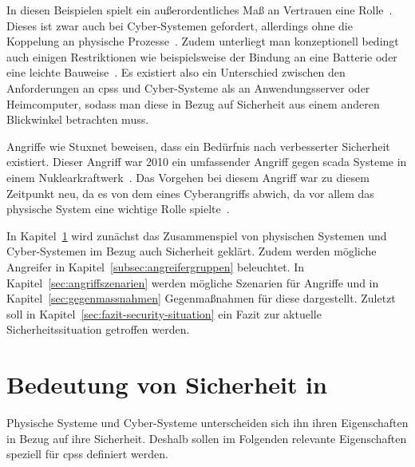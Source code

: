 \documentclass[final,bibliography=totocnumbered]{include/sikseminar}
\newcommand{\cps}{\glspl{cps}\xspace}
\begin{document}
    In diesen Beispielen spielt ein außerordentliches Maß an Vertrauen eine Rolle~\cite{SGL+08}.
    Dieses ist zwar auch bei Cyber-Systemen gefordert, allerdings ohne die Koppelung an physische Prozesse~\cite{BG11}.
    Zudem unterliegt man konzeptionell bedingt auch einigen Restriktionen wie beispielsweise der Bindung an eine Batterie oder eine leichte Bauweise~\cite{YWY+17}.
    Es existiert also ein Unterschied zwischen den Anforderungen an \cps und Cyber-Systeme als an Anwendungsserver oder Heimcomputer, sodass man diese in Bezug auf Sicherheit aus einem anderen Blickwinkel betrachten muss.

    Angriffe wie Stuxnet beweisen, dass ein Bedürfnis nach verbesserter Sicherheit existiert.
    Dieser Angriff war 2010 ein umfassender Angriff gegen \gls{scada} Systeme in einem Nuklearkraftwerk~\cite{Langner11}.
    Das Vorgehen bei diesem Angriff war zu diesem Zeitpunkt neu, da es von dem eines Cyberangriffs abwich, da vor allem das physische System eine wichtige Rolle spielte~\cite{Langner11}.

    In Kapitel~\ref{sec:bedeutung-sicherheit} wird zunächst das Zusammenspiel von physischen Systemen und Cyber-Systemen im Bezug auch Sicherheit geklärt.
    Zudem werden mögliche Angreifer in Kapitel~\ref{subsec:angreifergruppen} beleuchtet.
    In Kapitel~\ref{sec:angriffszenarien} werden mögliche Szenarien für Angriffe und in Kapitel~\ref{sec:gegenmassnahmen} Gegenmaßnahmen für diese dargestellt.
    Zuletzt soll in Kapitel~\ref{sec:fazit-security-situation} ein Fazit zur aktuelle Sicherheitssituation getroffen werden.

    \section{Bedeutung von Sicherheit in }
    \label{sec:bedeutung-sicherheit}

    Physische Systeme und Cyber-Systeme unterscheiden sich ihn ihren Eigenschaften in Bezug auf ihre Sicherheit.
    Deshalb sollen im Folgenden relevante Eigenschaften speziell für \cps definiert werden.
\end{document}
